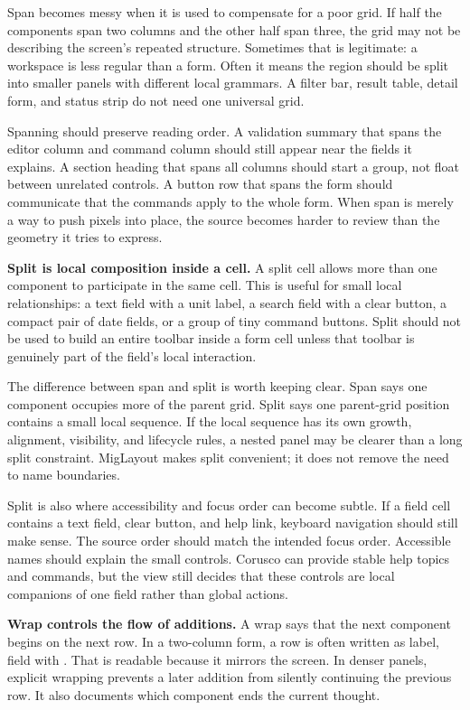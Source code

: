 Span becomes messy when it is used to compensate for a poor grid. If half the
components span two columns and the other half span three, the grid may not be
describing the screen's repeated structure. Sometimes that is legitimate: a
workspace is less regular than a form. Often it means the region should be
split into smaller panels with different local grammars. A filter bar, result
table, detail form, and status strip do not need one universal grid.

Spanning should preserve reading order. A validation summary that spans the
editor column and command column should still appear near the fields it
explains. A section heading that spans all columns should start a group, not
float between unrelated controls. A button row that spans the form should
communicate that the commands apply to the whole form. When span is merely a
way to push pixels into place, the source becomes harder to review than the
geometry it tries to express.

\textbf{Split is local composition inside a cell.} A split cell allows more
than one component to participate in the same cell. This is useful for small
local relationships: a text field with a unit label, a search field with a
clear button, a compact pair of date fields, or a group of tiny command
buttons. Split should not be used to build an entire toolbar inside a form
cell unless that toolbar is genuinely part of the field's local interaction.

The difference between span and split is worth keeping clear. Span says one
component occupies more of the parent grid. Split says one parent-grid position
contains a small local sequence. If the local sequence has its own growth,
alignment, visibility, and lifecycle rules, a nested panel may be clearer than
a long split constraint. MigLayout makes split convenient; it does not remove
the need to name boundaries.

Split is also where accessibility and focus order can become subtle. If a
field cell contains a text field, clear button, and help link, keyboard
navigation should still make sense. The source order should match the intended
focus order. Accessible names should explain the small controls. Corusco can
provide stable help topics and commands, but the view still decides that these
controls are local companions of one field rather than global actions.

\textbf{Wrap controls the flow of additions.} A wrap says that the next
component begins on the next row. In a two-column form, a row is often written
as label, field with . That is readable because it mirrors the
screen. In denser panels, explicit wrapping prevents a later addition from
silently continuing the previous row. It also documents which component ends
the current thought.

